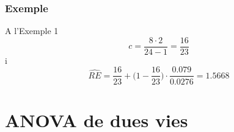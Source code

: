 \documentclass[12pt,t]{beamer}
\renewcommand{\emph}[1]{{\color{red}#1}}
\theoremstyle{plain}
\theoremstyle{definition}
\begin{document}
\begin{frame}[fragile]
\frametitle{Exemple}

A l'Exemple 1
$$
c=\frac{8\cdot 2}{24-1}=\frac{16}{23}
$$
i
$$
\widehat{RE}=\frac{16}{23}+\Big(1-\frac{16}{23}\Big)\cdot \frac{0.079}{0.0276}=1.5668
$$
%
%
\end{frame}

%
%
%
%
%
%
%
%
%


\section{ANOVA de dues vies}
\end{document}
